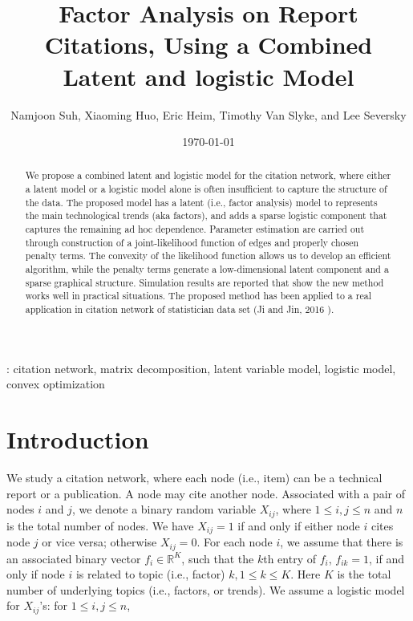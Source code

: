 \documentclass{article}
\begin{document}
\title{Factor Analysis on Report Citations, Using a Combined Latent and logistic Model}
\author{Namjoon Suh, Xiaoming Huo, Eric Heim, Timothy Van Slyke, and Lee Seversky}

\date{\today}
\maketitle

\begin{abstract}
We propose a combined latent and logistic model for the citation network, where either a latent model or a logistic model alone is often insufficient to capture the structure of the data.
    The proposed model has a latent (i.e., factor analysis) model to represents the main technological trends (aka factors), and adds a sparse logistic component that captures the remaining ad hoc dependence. Parameter estimation are carried out through construction of a joint-likelihood function of edges and properly chosen penalty terms. The convexity of the likelihood function allows us to develop an efficient algorithm, while the penalty terms generate a low-dimensional latent component and a sparse graphical structure. Simulation results are reported that show the new method works well in practical situations. The proposed method has been applied to a real application in citation network of statistician data set (Ji and Jin, 2016 \cite{ji2016coauthorship}).
\end{abstract}

: citation network, matrix decomposition, latent variable model,  logistic model, convex optimization

\section{Introduction}\label{sec:intro}
We study a citation network, where each node (i.e., item) can be a technical report or a publication. A node may cite another node. Associated with a pair of nodes $i$ and $j$, we denote a binary random variable $X_{ij}$, where $1 \le i,j \le n$ and $n$ is the total number of nodes. We have $X_{ij}=1$ if and only if either node $i$ cites node $j$ or vice versa; otherwise $X_{ij}=0$. For each node $i$, we assume that there is an associated binary vector $f_{i} \in \mathbb{R}^K$, such that the $k$th entry of $f_{i}$, $f_{ik} = 1$, if and only if node $i$ is related to topic (i.e., factor) $k, 1\le k \le K$. Here $K$ is the total number of underlying topics (i.e., factors, or trends). We assume a logistic model for $X_{ij}$'s: for $1\le i,j \le n$, 
\end{document}
